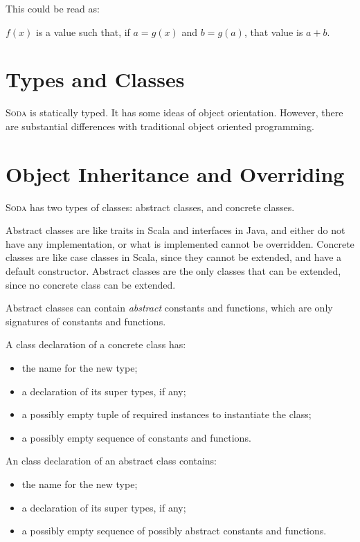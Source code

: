 \documentclass[12pt,a4paper]{book}
\newcommand{\Soda}{\textsc{Soda}\xspace}
\begin{document}
    This could be read as:
    \begin{center}
        $f(x)$ is a value such that, if $a = g(x)$ and $b = g(a)$, that value is $a + b$.
    \end{center}


    \section{Types and Classes}

    \Soda is statically typed.
    It has some ideas of object orientation.
    However, there are substantial differences with traditional object oriented programming.


    \section{Object Inheritance and Overriding}

    \Soda has two types of classes: abstract classes, and concrete classes.

    Abstract classes are like traits in Scala and interfaces in Java, and either do not have any implementation, or what is implemented cannot be overridden.
    Concrete classes are like case classes in Scala, since they cannot be extended, and have a default constructor.
    Abstract classes are the only classes that can be extended, since no concrete class can be extended.

    Abstract classes can contain \textit{abstract} constants and functions, which are only signatures of constants and functions.

    A class declaration of a concrete class has:
    \begin{itemize}
        \item the name for the new type;
        \item a declaration of its super types, if any;
        \item a possibly empty tuple of required instances to instantiate the class;
        \item a possibly empty sequence of constants and functions.
    \end{itemize}


    An class declaration of an abstract class contains:
    \begin{itemize}
        \item the name for the new type;
        \item a declaration of its super types, if any;
        \item a possibly empty sequence of possibly abstract constants and functions.
    \end{itemize}
\end{document}

